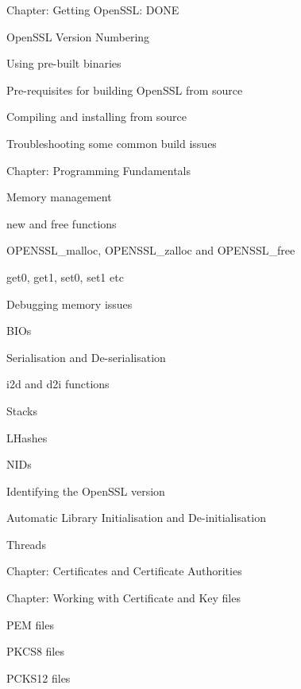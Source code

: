 \documentclass[oneside]{book}
\begin{document}
\begin{outline}
\begin{outline}
    \item{Chapter: Getting OpenSSL: DONE}
    \begin{outline}
      \item{OpenSSL Version Numbering}
      \item{Using pre-built binaries}
      \item{Pre-requisites for building OpenSSL from source}
      \item{Compiling and installing from source}
      \item{Troubleshooting some common build issues}
    \end{outline}
    \item{Chapter: Programming Fundamentals}
    \begin{outline}
      \item{Memory management}
      \begin{outline}
        \item{new and free functions}
        \item{OPENSSL\_malloc, OPENSSL\_zalloc and OPENSSL\_free}
        \item{get0, get1, set0, set1 etc}
        \item{Debugging memory issues}
      \end{outline}
      \item{BIOs}
      \item{Serialisation and De-serialisation}
      \begin{outline}
        \item{i2d and d2i functions}
      \end{outline}
      \item{Stacks}
      \item{LHashes}
      \item{NIDs}
      \item{Identifying the OpenSSL version}
      \item{Automatic Library Initialisation and De-initialisation}
      \item{Threads}
    \end{outline}
    \item{Chapter: Certificates and Certificate Authorities}
    \item{Chapter: Working with Certificate and Key files}
    \begin{outline}
      \item{PEM files}
      \item{PKCS8 files}
      \item{PCKS12 files}

\end{outline}
\end{outline}
\end{outline}
\end{document}

